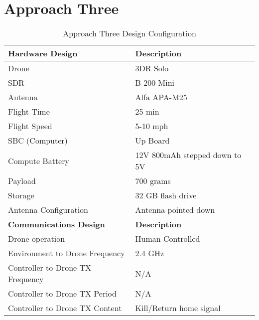 \section{Approach Three}
\begin{table}[ht]
\centering
\caption{Approach Three Design Configuration}
\label{table:approach_three}
\begin{tabular}{|l|l|}
    \hline  \textbf{Hardware Design}              & \textbf{Description}                      \\ \hline
            Drone                                 & 3DR Solo                                  \\
            SDR                                   & B-200 Mini                                \\
            Antenna                               & Alfa APA-M25                              \\
            Flight Time                           & 25 min                                    \\
            Flight Speed                          & 5-10 mph                                  \\
            SBC (Computer)                        & Up Board                                  \\
            Compute Battery                       & 12V 800mAh stepped down to 5V             \\
            Payload                               & 700 grams                                 \\
            Storage                               & 32 GB flash drive                         \\
            Antenna Configuration                 & Antenna pointed down                      \\
    \hline  \textbf{Communications Design}        & \textbf{Description}                      \\ \hline
            Drone operation                       & Human Controlled                          \\
            Environment to Drone Frequency        & 2.4 GHz                                   \\
            Controller to Drone TX Frequency      & N/A                                       \\
            Controller to Drone TX Period         & N/A                                       \\
            Controller to Drone TX Content        & Kill/Return home signal                   \\

\end{tabular}
\end{table}
